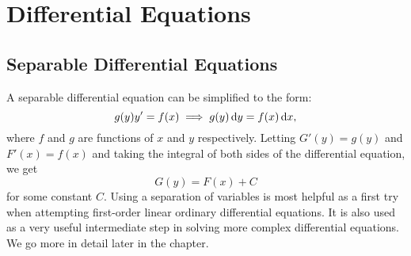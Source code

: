 \chapter{Differential Equations}
\section{Separable Differential Equations}

A separable differential equation can be simplified to the form:
$$g(y)y'=f(x) \implies g(y)\dif y = f(x) \dif x,$$
where $f$ and $g$ are functions of $x$ and $y$ respectively. Letting
$G'(y)=g(y)$ and $F'(x)=f(x)$ and taking the integral of both sides of the
differential equation, we get $$G(y) = F(x)+C$$ for some constant $C$. Using
a separation of variables is most helpful as a first try when attempting
first-order linear ordinary differential equations. It is also used as a very
useful intermediate step in solving more complex differential equations. We go 
more in detail later in the chapter.


